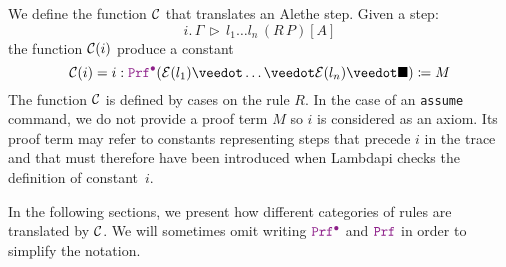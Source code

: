\begin{definition}
We define the function $\cal{C}$ that translates an Alethe step. Given a step:
\[
  i. \, \Gamma \, \triangleright\, l_1 \dots l_n\,(R\,P)[A]
\]
the function $\cal{C}(i)$ produce a constant
\[
  \cal{C}(i) = i: \pid (\E{l_1}\veedot\dots\veedot\E{l_n}\veedot \nil) \coloneq M
\]
The function $\cal{C}$ is defined by cases on the rule $R$.
In the case of an \texttt{assume} command, we do not provide a proof term $M$ so $i$ is considered as an axiom.
Its proof term may refer to constants representing steps that precede $i$ in the trace and that must therefore have been introduced when Lambdapi checks the definition of constant~$i$.
\label{def:function-c}
\end{definition}

In the following sections, we present how different categories of rules are translated by $\cal{C}$. We will sometimes omit writing $\pid$ and $\prf$ in order to simplify the notation.